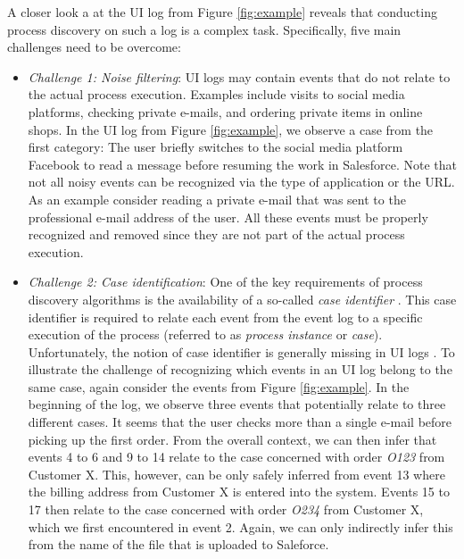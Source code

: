 A closer look a at the UI log from Figure \ref{fig:example} reveals that conducting process discovery on such a log is a complex task. Specifically, five main challenges need to be overcome: 

\begin{itemize}
\item \textit{Challenge 1: Noise filtering}: UI logs may contain events that do not relate to the actual process execution. Examples include visits to social media platforms, checking private e-mails, and ordering private items in online shops. In the UI log from Figure \ref{fig:example}, we observe a case from the first category: The user briefly switches to the social media platform Facebook to read a message before resuming the work in Salesforce. Note that not all noisy events can be recognized via the type of application or the URL. As an example consider reading a private e-mail that was sent to the professional e-mail address of the user. All these events must be properly recognized and removed since they are not part of the actual process execution. 
  
\item \textit{Challenge 2: Case identification}: One of the key requirements of process discovery algorithms is the availability of a so-called \textit{case identifier} \cite{van2016data}. This case identifier is required to relate each event from the event log to a specific execution of the process (referred to as \textit{process instance} or \textit{case}). Unfortunately, the notion of case identifier is generally missing in UI logs \cite{leno2021robotic}. To illustrate the challenge of recognizing which events in an UI log belong to the same case, again consider the events from Figure \ref{fig:example}. In the beginning of the log, we observe three events that potentially relate to three different cases. It seems that the user checks more than a single e-mail before picking up the first order. From the overall context, we can then infer that events 4 to 6 and 9 to 14 relate to the case concerned with order \textit{O123} from Customer X. This, however, can be only safely inferred from event 13 where the billing address from Customer X is entered into the system. Events 15 to 17 then relate to the case concerned with order \textit{O234} from Customer X, which we first encountered in event 2. Again, we can only indirectly infer this from the name of the file that is uploaded to Saleforce. 


\end{itemize}
